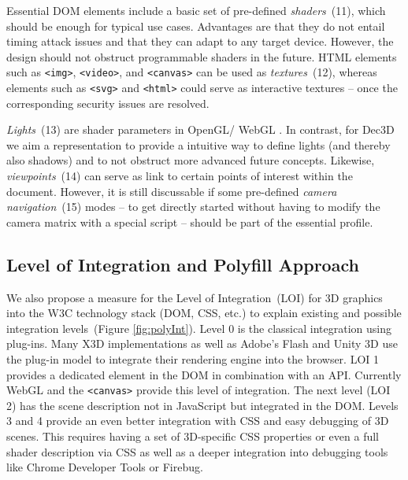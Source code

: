 \documentclass{acmsiggraph}
\begin{document}
Essential DOM elements include a basic set of pre-defined \textit{shaders}~(11), which should be enough for typical use cases. Advantages are that they do not entail timing attack issues and that they can adapt to any target device. However, the design should not obstruct programmable shaders in the future. HTML elements such as \verb|<img>|, \verb|<video>|, and \verb|<canvas>| can be used as \textit{textures}~(12), whereas elements such as \verb|<svg>| and \verb|<html>| could serve as interactive textures -- once the corresponding security issues are resolved.

\textit{Lights}~(13) are shader parameters in OpenGL/ WebGL \cite{WebGL12}. In contrast, for Dec3D we aim a representation to provide a intuitive way to define lights (and thereby also shadows) and to not obstruct more advanced future concepts.
Likewise, \textit{viewpoints}~(14) can serve as link to certain points of interest within the document. However, it is still discussable if some pre-defined \textit{camera navigation}~(15) modes -- to get directly started without having to modify the camera matrix with a special script -- should be part of the essential profile.


\subsection{Level of Integration and Polyfill Approach}
\label{subsection:polyfill}

We also propose a measure for the Level of Integration~(LOI) for 3D graphics into the W3C technology stack (DOM, CSS, etc.) to explain existing and possible integration levels~(Figure \ref{fig:polyInt}). Level 0 is the classical integration using plug-ins. Many X3D implementations as well as Adobe's Flash and Unity 3D use the plug-in model to integrate their rendering engine into the browser. LOI 1 provides a dedicated element in the DOM in combination with an API. Currently  WebGL and the \verb|<canvas>| provide this level of integration. The next level (LOI 2) has the scene description not in JavaScript but integrated in the DOM. Levels 3 and 4 provide an even better integration with CSS and easy debugging of 3D scenes. This requires having a set of 3D-specific CSS properties or even a full shader description via CSS as well as a deeper integration into debugging tools like Chrome Developer Tools or Firebug.
\end{document}

